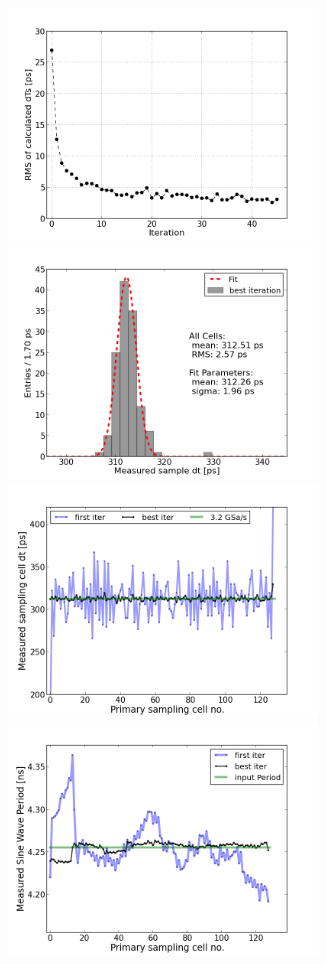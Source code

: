 \documentclass[11pt]{article}
\begin{document}
\begin{figure}[h!]
    \begin{center}
      \includegraphics[width=8.2cm]{fig/RMSvsIter_919.png}
      \includegraphics[width=8.2cm]{fig/dtHist_0919.png} \\
      \includegraphics[width=8.2cm]{fig/dtDifferentialNonlinearity_0919.png}
      \includegraphics[width=8.2cm]{fig/periodIntegralNonlinearity_0919.png}

\end{center}
\end{figure}
\end{document}
